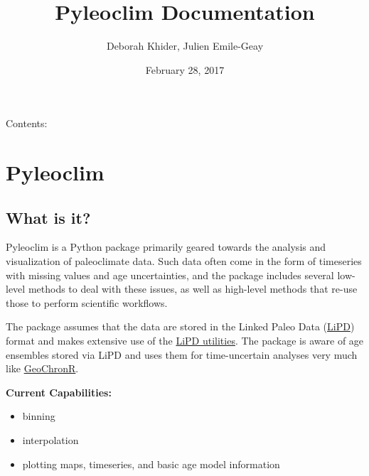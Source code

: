 \documentclass[letterpaper,10pt,english]{sphinxmanual}
\title{Pyleoclim Documentation}
\date{February 28, 2017}
\author{Deborah Khider, Julien Emile-Geay}
\begin{document}
\maketitle
\tableofcontents
{}\label{index::doc}


Contents:


\chapter{Pyleoclim}
\label{Introduction:welcome-to-pyleoclim-s-documentation}\label{Introduction::doc}\label{Introduction:pyleoclim}

\section{What is it?}
\label{Introduction:what-is-it}
Pyleoclim is a Python package primarily geared towards the analysis and visualization of paleoclimate data.
Such data often come in the form of timeseries with missing values and age uncertainties, and the package
includes several low-level methods to deal with these issues, as well as high-level methods that re-use those
to perform scientific workflows.

The package assumes that the data are stored in the Linked Paleo Data (\href{http://www.clim-past.net/12/1093/2016/}{LiPD})
format and makes extensive use of the \href{http://nickmckay.github.io/LiPD-utilities/}{LiPD utilities}. The package
is aware of age ensembles stored via LiPD and uses them for time-uncertain analyses very much like \href{http://nickmckay.github.io/GeoChronR/}{GeoChronR}.

\textbf{Current Capabilities:}
\begin{itemize}
\item {} 
binning

\item {} 
interpolation

\item {} 
plotting maps, timeseries, and basic age model information

\end{itemize}
\end{document}
